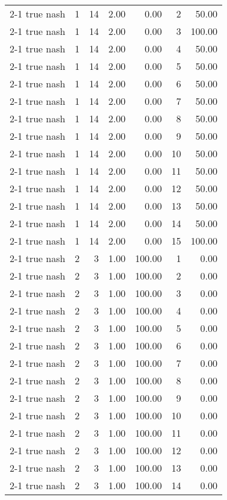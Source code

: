 \begin{tabular}{lrrrrrr}
2-1  true nash & 1 & 14 & 2.00 & 0.00 & 2 & 50.00 \\
2-1  true nash & 1 & 14 & 2.00 & 0.00 & 3 & 100.00 \\
2-1  true nash & 1 & 14 & 2.00 & 0.00 & 4 & 50.00 \\
2-1  true nash & 1 & 14 & 2.00 & 0.00 & 5 & 50.00 \\
2-1  true nash & 1 & 14 & 2.00 & 0.00 & 6 & 50.00 \\
2-1  true nash & 1 & 14 & 2.00 & 0.00 & 7 & 50.00 \\
2-1  true nash & 1 & 14 & 2.00 & 0.00 & 8 & 50.00 \\
2-1  true nash & 1 & 14 & 2.00 & 0.00 & 9 & 50.00 \\
2-1  true nash & 1 & 14 & 2.00 & 0.00 & 10 & 50.00 \\
2-1  true nash & 1 & 14 & 2.00 & 0.00 & 11 & 50.00 \\
2-1  true nash & 1 & 14 & 2.00 & 0.00 & 12 & 50.00 \\
2-1  true nash & 1 & 14 & 2.00 & 0.00 & 13 & 50.00 \\
2-1  true nash & 1 & 14 & 2.00 & 0.00 & 14 & 50.00 \\
2-1  true nash & 1 & 14 & 2.00 & 0.00 & 15 & 100.00 \\
2-1  true nash & 2 & 3 & 1.00 & 100.00 & 1 & 0.00 \\
2-1  true nash & 2 & 3 & 1.00 & 100.00 & 2 & 0.00 \\
2-1  true nash & 2 & 3 & 1.00 & 100.00 & 3 & 0.00 \\
2-1  true nash & 2 & 3 & 1.00 & 100.00 & 4 & 0.00 \\
2-1  true nash & 2 & 3 & 1.00 & 100.00 & 5 & 0.00 \\
2-1  true nash & 2 & 3 & 1.00 & 100.00 & 6 & 0.00 \\
2-1  true nash & 2 & 3 & 1.00 & 100.00 & 7 & 0.00 \\
2-1  true nash & 2 & 3 & 1.00 & 100.00 & 8 & 0.00 \\
2-1  true nash & 2 & 3 & 1.00 & 100.00 & 9 & 0.00 \\
2-1  true nash & 2 & 3 & 1.00 & 100.00 & 10 & 0.00 \\
2-1  true nash & 2 & 3 & 1.00 & 100.00 & 11 & 0.00 \\
2-1  true nash & 2 & 3 & 1.00 & 100.00 & 12 & 0.00 \\
2-1  true nash & 2 & 3 & 1.00 & 100.00 & 13 & 0.00 \\
2-1  true nash & 2 & 3 & 1.00 & 100.00 & 14 & 0.00 \\

\end{tabular}

